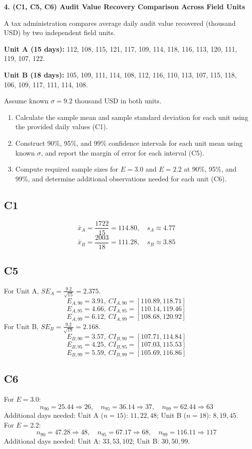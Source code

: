 \begin{ExamProblems}
		\newpage
		\item
		\textbf{4. (C1, C5, C6) Audit Value Recovery Comparison Across Field Units}
		
		A tax administration compares average daily audit value recovered (thousand USD) by two independent field units.
		
		\textbf{Unit A (15 days):} 112, 108, 115, 121, 117, 109, 114, 118, 116, 113, 120, 111, 119, 107, 122.
		
		\textbf{Unit B (18 days):} 105, 109, 111, 114, 108, 112, 116, 110, 113, 107, 115, 118, 106, 109, 117, 111, 114, 108.
		
		Assume known $\sigma=9.2$ thousand USD in both units.
		\begin{enumerate}
			\item Calculate the sample mean and sample standard deviation for each unit using the provided daily values (C1).
			\item Construct 90\%, 95\%, and 99\% confidence intervals for each unit mean using known $\sigma$, and report the margin of error for each interval (C5).
			\item Compute required sample sizes for $E=3.0$ and $E=2.2$ at 90\%, 95\%, and 99\%, and determine additional observations needed for each unit (C6).
		\end{enumerate}
		
		\subsection*{C1}
		\[
		\bar{x}_A=\frac{1722}{15}=114.80,
		\quad s_A\approx4.77
		\]
		\[
		\bar{x}_B=\frac{2003}{18}=111.28,
		\quad s_B\approx3.85
		\]
		
		\subsection*{C5}
		For Unit A, $SE_A=\frac{9.2}{\sqrt{15}}=2.375$.
		\[
		E_{A,90}=3.91,\ CI_{A,90}=[110.89,118.71]
		\]
		\[
		E_{A,95}=4.66,\ CI_{A,95}=[110.14,119.46]
		\]
		\[
		E_{A,99}=6.12,\ CI_{A,99}=[108.68,120.92]
		\]
		For Unit B, $SE_B=\frac{9.2}{\sqrt{18}}=2.168$.
		\[
		E_{B,90}=3.57,\ CI_{B,90}=[107.71,114.84]
		\]
		\[
		E_{B,95}=4.25,\ CI_{B,95}=[107.03,115.53]
		\]
		\[
		E_{B,99}=5.59,\ CI_{B,99}=[105.69,116.86]
		\]
		
		\subsection*{C6}
		For $E=3.0$:
		\[
		n_{90}=25.44\Rightarrow26,\quad n_{95}=36.14\Rightarrow37,\quad n_{99}=62.44\Rightarrow63
		\]
		Additional days needed:
		Unit A ($n=15$): $11,22,48$; Unit B ($n=18$): $8,19,45$.
		For $E=2.2$:
		\[
		n_{90}=47.28\Rightarrow48,\quad n_{95}=67.17\Rightarrow68,\quad n_{99}=116.11\Rightarrow117
		\]
		Additional days needed:
		Unit A: $33,53,102$; Unit B: $30,50,99$.
		

\end{ExamProblems}
